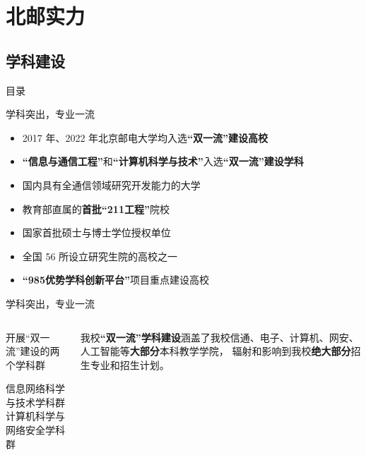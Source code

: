 \documentclass[aspectratio=169, utf8]{beamer}
\begin{document}
\section{北邮实力}

\subsection*{学科建设}

\begin{frame}{目录}
    \begin{multicols}{2}
        \tableofcontents[sectionstyle=show,subsectionstyle=hide,currentsection]
    \end{multicols}
\end{frame}

\begin{frame}{学科突出，专业一流}
    \begin{itemize}
        \item 2017 年、2022 年北京邮电大学均入选\textcolor{Fore}{\textbf{“双一流”建设高校}}
        \item \textcolor{Fore}{\textbf{“信息与通信工程”}}和\textcolor{Fore}{\textbf{“计算机科学与技术”}}入选\textcolor{Fore}{\textbf{“双一流”建设学科}}
        \item 国内具有全通信领域研究开发能力的大学
        \item 教育部直属的\textcolor{Fore}{\textbf{首批“211工程”}}院校
        \item 国家首批硕士与博士学位授权单位
        \item 全国 56 所设立研究生院的高校之一
        \item \textcolor{Fore}{\textbf{“985优势学科创新平台”}}项目重点建设高校
    \end{itemize}
\end{frame}

\begin{frame}{学科突出，专业一流}
    \begin{columns}
        \begin{block}{开展“双一流”建设的两个学科群}
            \begin{multicols}{2}
                \centering

                信息网络科学与技术学科群\\

                计算机科学与网络安全学科群
            \end{multicols}
        \end{block}

        \setlength{\parindent}{2em}

        我校\textcolor{Fore}{\textbf{“双一流”学科建设}}涵盖了我校信通、电子、计算机、网安、人工智能等\textcolor{Fore}{\textbf{大部分}}本科教学学院，
        辐射和影响到我校\textcolor{Fore}{\textbf{绝大部分}}招生专业和招生计划。
    \end{columns}
\end{frame}
\end{document}
